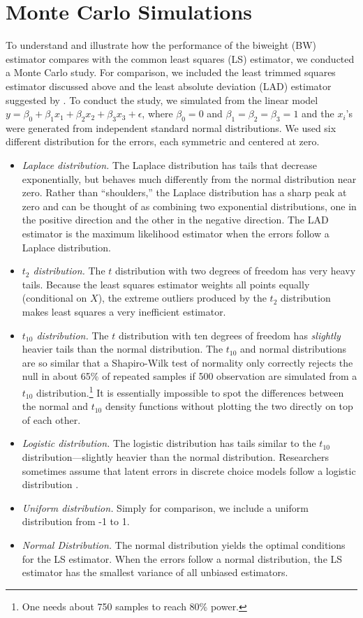 \documentclass[12pt]{article}
\begin{document}
\section*{Monte Carlo Simulations}

To understand and illustrate how the performance of the biweight (BW) estimator compares with the common least squares (LS) estimator, we conducted a Monte Carlo study. For comparison, we included the least trimmed squares estimator discussed above and the least absolute deviation (LAD) estimator suggested by \cite{HardenDesmarais2011}. To conduct the study, we simulated from the linear model $y = \beta_0 + \beta_1x_1 + \beta_2 x_2 + \beta_3 x_3 + \epsilon$, where $\beta_0 = 0$ and $\beta_1 = \beta_2 = \beta_3 = 1$ and the $x_i$'s were generated from independent standard normal distributions. 
We used six different distribution for the errors, each symmetric and centered at zero.
\begin{itemize}
\item \textit{Laplace distribution.} 
The Laplace distribution has tails that decrease exponentially, but behaves much differently from the normal distribution near zero. 
Rather than ``shoulders,'' the Laplace distribution has a sharp peak at zero and can be thought of as combining two exponential distributions, one in the positive direction and the other in the negative direction.
The LAD estimator is the maximum likelihood estimator when the errors follow a Laplace distribution.
\item \textit{$t_2$ distribution.} 
The $t$ distribution with two degrees of freedom has very heavy tails. 
Because the least squares estimator weights all points equally (conditional on $X$), the extreme outliers produced by the $t_2$ distribution makes least squares a very inefficient estimator.
\item \textit{$t_{10}$ distribution.} 
The $t$ distribution with ten degrees of freedom has \textit{slightly} heavier tails than the normal distribution. 
The $t_{10}$ and normal distributions are so similar that a Shapiro-Wilk test of normality only correctly rejects the null in about 65\% of repeated samples if 500 observation are simulated from a $t_{10}$ distribution.\footnote{One needs about 750 samples to reach 80\% power.} 
It is essentially impossible to spot the differences between the normal and $t_{10}$ density functions without plotting the two directly on top of each other.
\item \textit{Logistic distribution.} The logistic distribution has tails similar to the $t_{10}$ distribution---slightly heavier than the normal distribution. Researchers sometimes assume that latent errors in discrete choice models follow a logistic distribution \citep{Train2009}.
\item \textit{Uniform distribution.} Simply for comparison, we include a uniform distribution from -1 to 1.
\item \textit{Normal Distribution.} The normal distribution yields the optimal conditions for the LS estimator. 
When the errors follow a normal distribution, the LS estimator has the smallest variance of all unbiased estimators. 
\end{itemize}
\end{document}
